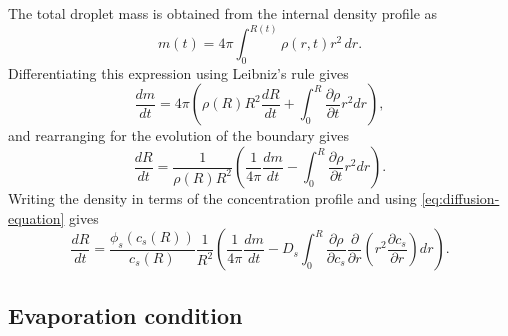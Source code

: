 \documentclass[12pt]{report}
\begin{document}
The total droplet mass is obtained from the internal density profile as
\begin{equation}\label{eq:mass-equation}
  m(t) = 4\pi \int_0^{R(t)} \rho(r,t) r^2 \, dr.
\end{equation}
Differentiating this expression using Leibniz's rule gives
\begin{equation}
  \frac{dm}{dt} = 4\pi \left(
  \rho(R) R^2 \frac{dR}{dt} + \int_0^R \frac{\partial \rho}{\partial t} r^2 dr
  \right),
\end{equation}
and rearranging for the evolution of the boundary gives
\begin{equation}
  \frac{dR}{dt} =
  \frac{1}{\rho(R) R^2} \left(
  \frac{1}{4\pi} \frac{dm}{dt} - \int_0^R \frac{\partial \rho}{\partial t} r^2 dr
  \right).
\end{equation}
Writing the density in terms of the concentration profile and using \eqref{eq:diffusion-equation} gives
\begin{equation}\label{eq:radial-evolution}
  \frac{dR}{dt} =
  \frac{\phi_s(c_s(R))}{c_s(R)} \frac{1}{R^2} \left(
  \frac{1}{4\pi} \frac{dm}{dt} -
  D_s \int_0^R
  \frac{\partial \rho}{\partial c_s}
  \frac{\partial}{\partial r} \left( r^2 \frac{\partial c_s}{\partial r} \right) dr
  \right).
\end{equation}

\subsection{Evaporation condition}
\end{document}
